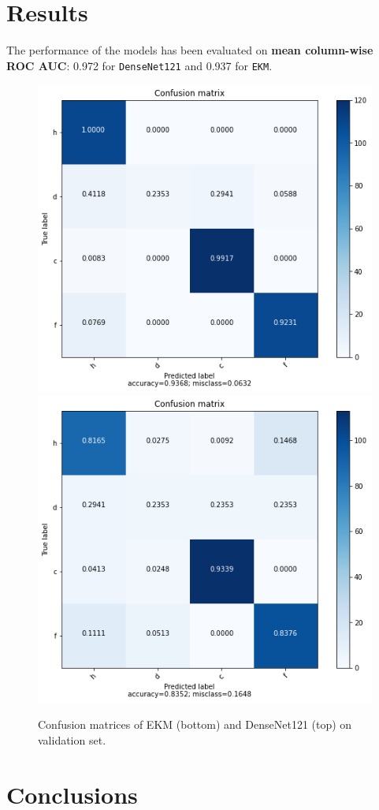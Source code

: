 \documentclass[aps,twocolumn,secnumarabic,nobalancelastpage,amsmath,amssymb,
nofootinbib]{revtex4}
\begin{document}
\section{Results}\label{results}

The performance of the models has been evaluated on \textbf{mean
column-wise ROC AUC}: 0.972 for \texttt{DenseNet121} and 0.937 for
\texttt{EKM}.

\begin{figure}[h]
	\centering
	\includegraphics[width=0.7\linewidth]{Images/ConfusionMatrixDenseNet121}
	\includegraphics[width=0.7\linewidth]{Images/ConfusionMatrixEKM}
	\caption{Confusion matrices of EKM (bottom) and DenseNet121 (top) on validation set.}
	\label{fig:confusionmatrixdensenet121}
\end{figure}


\section{Conclusions}\label{conclusions}
\end{document}
